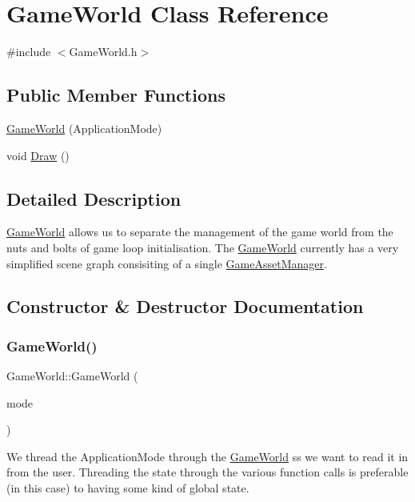 \hypertarget{classGameWorld}{}\section{Game\+World Class Reference}
\label{classGameWorld}


{\ttfamily \#include $<$Game\+World.\+h$>$}

\subsection*{Public Member Functions}
\begin{DoxyCompactItemize}
\item 
\hyperlink{classGameWorld_a17a84e57a80600961088afc753036f89}{Game\+World} (Application\+Mode)
\item 
void \hyperlink{classGameWorld_a275418607d8286979b276f165ad5876b}{Draw} ()
\end{DoxyCompactItemize}


\subsection{Detailed Description}
\hyperlink{classGameWorld}{Game\+World} allows us to separate the management of the game world from the nuts and bolts of game loop initialisation. The \hyperlink{classGameWorld}{Game\+World} currently has a very simplified scene graph consisiting of a single \hyperlink{classGameAssetManager}{Game\+Asset\+Manager}. 

\subsection{Constructor \& Destructor Documentation}
\mbox{\label{classGameWorld_a17a84e57a80600961088afc753036f89}} 
\subsubsection{\texorpdfstring{Game\+World()}{GameWorld()}}
{\footnotesize\ttfamily Game\+World\+::\+Game\+World (\begin{DoxyParamCaption}\item[{Application\+Mode}]{mode }\end{DoxyParamCaption})}

We thread the Application\+Mode through the \hyperlink{classGameWorld}{Game\+World} ss we want to read it in from the user. Threading the state through the various function calls is preferable (in this case) to having some kind of global state. 

